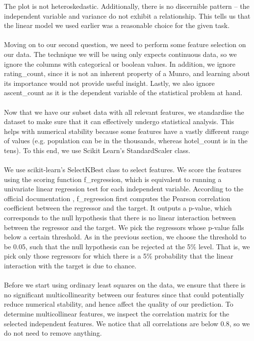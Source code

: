 \documentclass[11pt,a4paper]{article}
\begin{document}
The plot is not heteroskedastic. Additionally, there is no discernible pattern – the independent variable and variance do not exhibit a relationship. This tells us that the linear model we used earlier was a reasonable choice for the given task. \\ \\
Moving on to our second question, we need to perform some feature selection on our data. The technique we will be using only expects continuous data, so we ignore the columns with categorical or boolean values. In addition, we ignore rating\_count, since it is not an inherent property of a Munro, and learning about its importance would not provide useful insight. Lastly, we also ignore ascent\_count as it is the dependent variable of the statistical problem at hand. \\ \\
Now that we have our subset data with all relevant features, we standardise the dataset to make sure that it can effectively undergo statistical analysis. This helps with numerical stability because some features have a vastly different range of values (e.g. population can be in the thousands, whereas hotel\_count is in the tens). To this end, we use Scikit Learn's StandardScaler class. \\ \\
We use scikit-learn's SelectKBest class to select features. We score the features using the scoring function f\_regression, which is equivalent to running a univariate linear regression test for each independent variable. According to the official documentation \cite{scikit-learn}, f\_regression first computes the Pearson correlation coefficient between the regressor and the target. It outputs a p-value, which corresponds to the null hypothesis that there is no linear interaction between between the regressor and the target. We pick the regressors whose p-value falls below a certain threshold. As in the previous section, we choose the threshold to be 0.05, such that the null hypothesis can be rejected at the 5\% level. That is, we pick only those regressors for which there is a 5\% probability that the linear interaction with the target is due to chance. \\ \\
Before we start using ordinary least squares on the data, we ensure that there is no significant multicollinearity between our features since that could potentially reduce numerical stability, and hence affect the quality of our prediction. To determine multicollinear features, we inspect the correlation matrix for the selected independent features. We notice that all correlations are below 0.8, so we do not need to remove anything. \\ 
\end{document}
